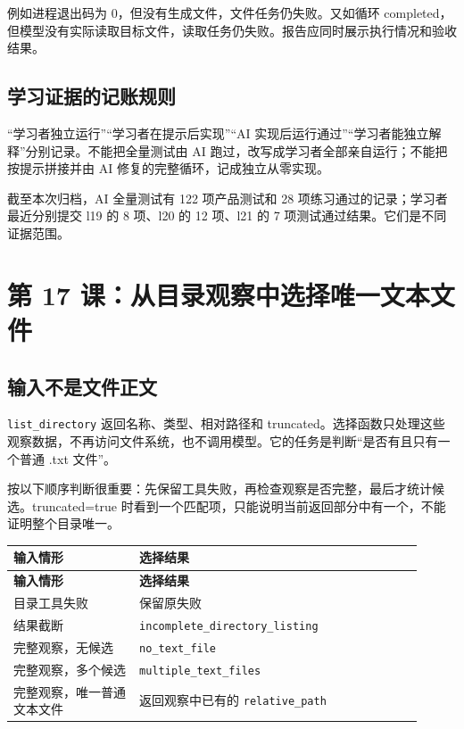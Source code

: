 \documentclass[UTF8,zihao=-4,fontset=fandol]{ctexart}
\begin{document}
例如进程退出码为 0，但没有生成文件，文件任务仍失败。又如循环 completed，但模型没有实际读取目标文件，读取任务仍失败。报告应同时展示执行情况和验收结果。

\subsection{学习证据的记账规则}

“学习者独立运行”“学习者在提示后实现”“AI 实现后运行通过”“学习者能独立解释”分别记录。不能把全量测试由 AI 跑过，改写成学习者全部亲自运行；不能把按提示拼接并由 AI 修复的完整循环，记成独立从零实现。

截至本次归档，AI 全量测试有 122 项产品测试和 28 项练习通过的记录；学习者最近分别提交 l19 的 8 项、l20 的 12 项、l21 的 7 项测试通过结果。它们是不同证据范围。

\section{第 17 课：从目录观察中选择唯一文本文件}

\subsection{输入不是文件正文}

\nolinkurl{list_directory} 返回名称、类型、相对路径和 truncated。选择函数只处理这些观察数据，不再访问文件系统，也不调用模型。它的任务是判断“是否有且只有一个普通 .txt 文件”。

按以下顺序判断很重要：先保留工具失败，再检查观察是否完整，最后才统计候选。truncated=true 时看到一个匹配项，只能说明当前返回部分中有一个，不能证明整个目录唯一。

{\small\setlength{\tabcolsep}{4pt}
\renewcommand{\arraystretch}{1.25}
\begin{longtable}{>{\raggedright\arraybackslash}p{0.28\linewidth}>{\raggedright\arraybackslash}p{0.63\linewidth}}
\toprule
\textbf{输入情形} & \textbf{选择结果} \\
\midrule\endfirsthead
\toprule
\textbf{输入情形} & \textbf{选择结果} \\
\midrule\endhead
\bottomrule\endfoot
目录工具失败 & 保留原失败 \\
结果截断 & \nolinkurl{incomplete_directory_listing} \\
完整观察，无候选 & \nolinkurl{no_text_file} \\
完整观察，多个候选 & \nolinkurl{multiple_text_files} \\
完整观察，唯一普通文本文件 & 返回观察中已有的 \nolinkurl{relative_path} \\
\end{longtable}}
\end{document}
